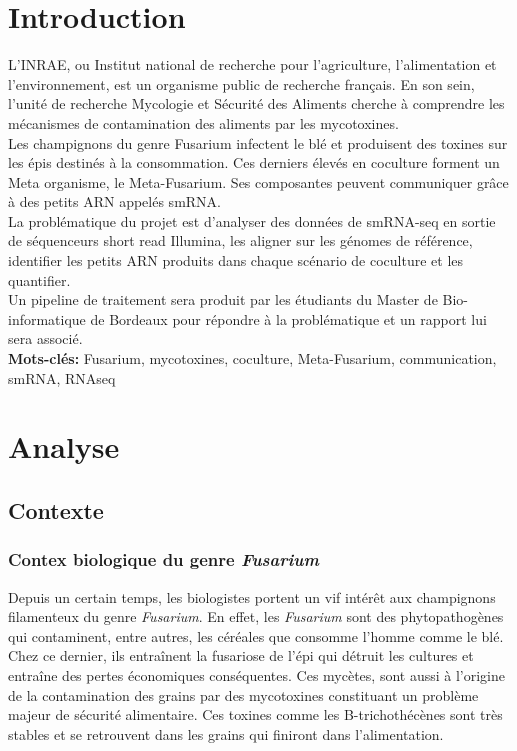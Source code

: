 \documentclass{report}
\begin{document}
\tableofcontents
\newpage

\chapter{Introduction}

L'INRAE, ou Institut national de recherche pour l'agriculture, l'alimentation et l'environnement, est un organisme public de recherche français. En son sein,  l’unité de recherche Mycologie et Sécurité des Aliments cherche à comprendre les mécanismes de contamination des aliments par les mycotoxines. \cite{inrae} \\

Les champignons du genre Fusarium infectent le blé et produisent des toxines sur les épis destinés à la consommation. Ces derniers élevés en coculture forment un Meta organisme, le Meta-Fusarium. Ses composantes peuvent communiquer grâce à des petits ARN appelés smRNA. \\

La problématique du projet est d’analyser des données de smRNA-seq en sortie de séquenceurs short read Illumina, les aligner sur les génomes de référence, identifier les petits ARN produits dans chaque scénario de coculture et les quantifier.\\

Un pipeline de traitement sera produit par les étudiants du Master de Bio-informatique de Bordeaux pour répondre à la problématique et un rapport lui sera associé. \\

{\bf Mots-clés:} Fusarium, mycotoxines, coculture, Meta-Fusarium, communication, smRNA, RNAseq


\chapter{Analyse}
\section{Contexte}
\subsection{Contex biologique du genre \textit{Fusarium}}
Depuis un certain temps, les biologistes portent un vif intérêt aux champignons filamenteux du genre \textit{Fusarium}. En effet, les \textit{Fusarium} sont des phytopathogènes qui contaminent, entre autres, les céréales que consomme l’homme comme le blé. Chez ce dernier, ils entraînent la fusariose de l'épi qui détruit les cultures et entraîne des pertes économiques conséquentes. Ces mycètes, sont aussi à l’origine de la contamination des grains par des mycotoxines constituant un problème majeur de sécurité alimentaire. Ces toxines comme les B-trichothécènes sont très stables et se retrouvent dans les grains qui finiront dans l’alimentation.\\
\end{document}
